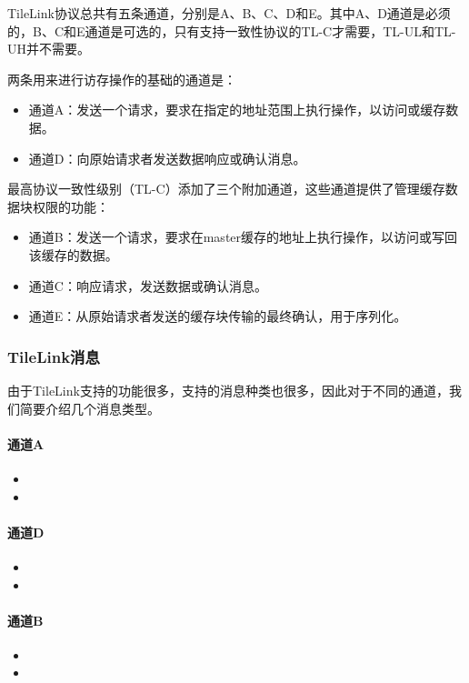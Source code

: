 \begin{center}
TileLink协议总共有五条通道，分别是A、B、C、D和E。其中A、D通道是必须的，B、C和E通道是可选的，只有支持一致性协议的TL-C才需要，TL-UL和TL-UH并不需要。

两条用来进行访存操作的基础的通道是：

\begin{itemize}
	\item 通道A：发送一个请求，要求在指定的地址范围上执行操作，以访问或缓存数据。
	\item 通道D：向原始请求者发送数据响应或确认消息。
\end{itemize}

最高协议一致性级别（TL-C）添加了三个附加通道，这些通道提供了管理缓存数据块权限的功能：
\begin{itemize}
	\item 通道B：发送一个请求，要求在master缓存的地址上执行操作，以访问或写回该缓存的数据。
	\item 通道C：响应请求，发送数据或确认消息。
	\item 通道E：从原始请求者发送的缓存块传输的最终确认，用于序列化。
\end{itemize}

\subsubsection{TileLink消息}

由于TileLink支持的功能很多，支持的消息种类也很多，因此对于不同的通道，我们简要介绍几个消息类型。

\paragraph{通道A}
\begin{itemize}
	\item 
	\item 
\end{itemize}

\paragraph{通道D}
\begin{itemize}
	\item 
	\item 
\end{itemize}

\paragraph{通道B}
\begin{itemize}
	\item 
	\item 
\end{itemize}


\end{center}
